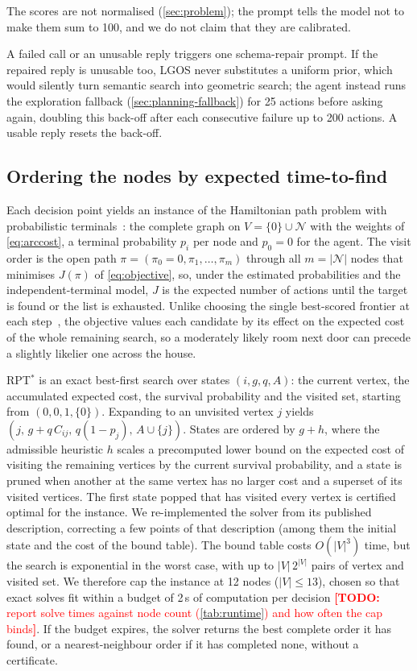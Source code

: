 \documentclass[10pt]{article}
\newcommand{\TODO}[1]{\textcolor{red}{\textbf{[TODO:} #1\textbf{]}}}
\newcommand{\ours}{LGOS\xspace}
\newcommand{\N}{\mathcal{N}}
\begin{document}
The scores are not normalised (\cref{sec:problem}); the prompt tells the model not to make them sum to 100, and we do not claim that they are calibrated.

A failed call or an unusable reply triggers one schema-repair prompt. If the repaired reply is unusable too, \ours never substitutes a uniform prior, which would silently turn semantic search into geometric search; the agent instead runs the exploration fallback (\cref{sec:planning-fallback}) for 25 actions before asking again, doubling this back-off after each consecutive failure up to 200 actions. A usable reply resets the back-off.

\subsection{Ordering the nodes by expected time-to-find}
\label{sec:planning-order}

Each decision point yields an instance of the Hamiltonian path problem with probabilistic terminals~\citep{lyu2026rpt}: the complete graph on $V=\{0\}\cup\N$ with the weights of \cref{eq:arccost}, a terminal probability $p_i$ per node and $p_0=0$ for the agent. The visit order is the open path $\pi=(\pi_0{=}0,\pi_1,\dots,\pi_m)$ through all $m=|\N|$ nodes that minimises $J(\pi)$ of \cref{eq:objective}, so, under the estimated probabilities and the independent-terminal model, $J$ is the expected number of actions until the target is found or the list is exhausted. Unlike choosing the single best-scored frontier at each step~\citep{yu2023l3mvn,zhou2023esc}, the objective values each candidate by its effect on the expected cost of the whole remaining search, so a moderately likely room next door can precede a slightly likelier one across the house.

RPT$^*$ is an exact best-first search over states $(i,g,q,A)$: the current vertex, the accumulated expected cost, the survival probability and the visited set, starting from $(0,0,1,\{0\})$. Expanding to an unvisited vertex $j$ yields $(j,\,g+q\,C_{ij},\,q(1-p_j),\,A\cup\{j\})$. States are ordered by $g+h$, where the admissible heuristic $h$ scales a precomputed lower bound on the expected cost of visiting the remaining vertices by the current survival probability, and a state is pruned when another at the same vertex has no larger cost and a superset of its visited vertices. The first state popped that has visited every vertex is certified optimal for the instance. We re-implemented the solver from its published description, correcting a few points of that description (among them the initial state and the cost of the bound table). The bound table costs $O(|V|^3)$ time, but the search is exponential in the worst case, with up to $|V|\,2^{|V|}$ pairs of vertex and visited set. We therefore cap the instance at 12 nodes ($|V|\le 13$), chosen so that exact solves fit within a budget of 2\,s of computation per decision \TODO{report solve times against node count (\cref{tab:runtime}) and how often the cap binds}. If the budget expires, the solver returns the best complete order it has found, or a nearest-neighbour order if it has completed none, without a certificate.
\end{document}
